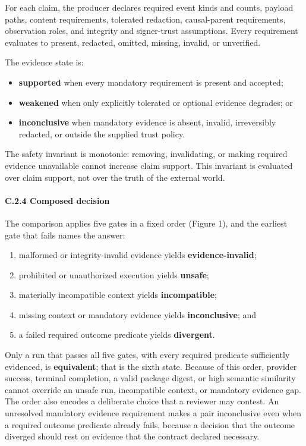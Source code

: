 \documentclass[
  american,
  10pt,
  a4paper,
]{article}
\providecommand{\tightlist}{%
  \setlength{\itemsep}{0pt}\setlength{\parskip}{0pt}}
\begin{document}
For each claim, the producer declares required event kinds and counts,
payload paths, content requirements, tolerated redaction, causal-parent
requirements, observation roles, and integrity and signer-trust
assumptions. Every requirement evaluates to present, redacted, omitted,
missing, invalid, or unverified.

The evidence state is:

\begin{itemize}
\tightlist
\item
  \textbf{supported} when every mandatory requirement is present and
  accepted;
\item
  \textbf{weakened} when only explicitly tolerated or optional evidence
  degrades; or
\item
  \textbf{inconclusive} when mandatory evidence is absent, invalid,
  irreversibly redacted, or outside the supplied trust policy.
\end{itemize}

The safety invariant is monotonic: removing, invalidating, or making
required evidence unavailable cannot increase claim support. This
invariant is evaluated over claim support, not over the truth of the
external world.

\paragraph{C.2.4 Composed decision}\label{c.2.4-composed-decision}

The comparison applies five gates in a fixed order (Figure 1), and the
earliest gate that fails names the answer:

\begin{enumerate}
\def\labelenumi{\arabic{enumi}.}
\tightlist
\item
  malformed or integrity-invalid evidence yields
  \textbf{evidence-invalid};
\item
  prohibited or unauthorized execution yields \textbf{unsafe};
\item
  materially incompatible context yields \textbf{incompatible};
\item
  missing context or mandatory evidence yields \textbf{inconclusive};
  and
\item
  a failed required outcome predicate yields \textbf{divergent}.
\end{enumerate}

Only a run that passes all five gates, with every required predicate
sufficiently evidenced, is \textbf{equivalent}; that is the sixth state.
Because of this order, provider success, terminal completion, a valid
package digest, or high semantic similarity cannot override an unsafe
run, incompatible context, or mandatory evidence gap. The order also
encodes a deliberate choice that a reviewer may contest. An unresolved
mandatory evidence requirement makes a pair inconclusive even when a
required outcome predicate already fails, because a decision that the
outcome diverged should rest on evidence that the contract declared
necessary.
\end{document}
